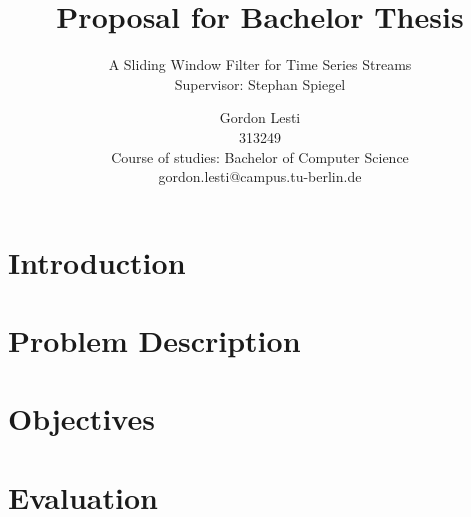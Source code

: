 \documentclass[runningheads,a4paper]{llncs}
\begin{document}
    \mainmatter

    \title{Proposal for Bachelor Thesis}
    \subtitle{A Sliding Window Filter for Time Series Streams\\
    \textnormal{\small{Supervisor: Stephan Spiegel\\\vspace{1\baselineskip}}}}


    \author{Gordon Lesti\\313249\\Course of studies: Bachelor of Computer Science\\gordon.lesti@campus.tu-berlin.de\\\vspace{5\baselineskip}}



    \maketitle

    \section{Introduction}

    \section{Problem Description}

    \section{Objectives}

    \section{Evaluation}


\end{document}
